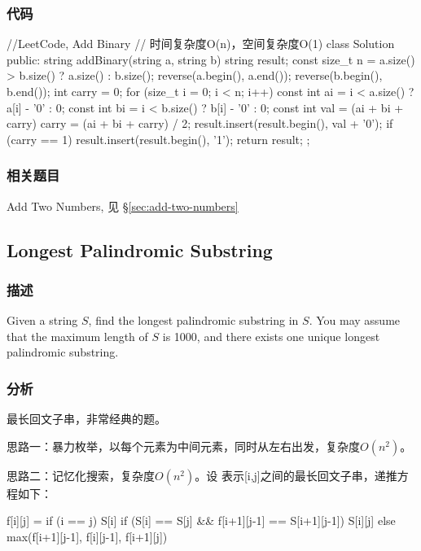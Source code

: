 \subsubsection{代码}
\begin{Code}
	//LeetCode, Add Binary
	// 时间复杂度O(n)，空间复杂度O(1)
	class Solution {
		public:
		string addBinary(string a, string b) {
			string result;
			const size_t n = a.size() > b.size() ? a.size() : b.size();
			reverse(a.begin(), a.end());
			reverse(b.begin(), b.end());
			int carry = 0;
			for (size_t i = 0; i < n; i++) {
				const int ai = i < a.size() ? a[i] - '0' : 0;
				const int bi = i < b.size() ? b[i] - '0' : 0;
				const int val = (ai + bi + carry) %
				carry = (ai + bi + carry) / 2;
				result.insert(result.begin(), val + '0');
			}
			if (carry == 1) {
				result.insert(result.begin(), '1');
			}
			return result;
		}
	};
\end{Code}


\subsubsection{相关题目}
\begindot
\item Add Two Numbers, 见 \S \ref{sec:add-two-numbers}
\myenddot


\subsection{Longest Palindromic Substring} %
\label{sec:longest-palindromic-substring}


\subsubsection{描述}
Given a string $S$, find the longest palindromic substring in $S$. You may assume that the maximum length of $S$ is 1000, and there exists one unique longest palindromic substring.


\subsubsection{分析}
最长回文子串，非常经典的题。

思路一：暴力枚举，以每个元素为中间元素，同时从左右出发，复杂度$O(n^2)$。

思路二：记忆化搜索，复杂度$O(n^2)$。设 表示[i,j]之间的最长回文子串，递推方程如下：
\begin{Code}
	f[i][j] = if (i == j) S[i]
	if (S[i] == S[j] && f[i+1][j-1] == S[i+1][j-1]) S[i][j]
	else max(f[i+1][j-1], f[i][j-1], f[i+1][j])
\end{Code}

